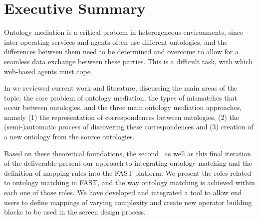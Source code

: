 \documentclass{fast_latex}
\begin{document}
\newpage


\clearpage

\section*{Executive Summary}
\doublespacing
Ontology mediation is a critical problem in heterogeneous environments, since inter-operating services and agents often use different
ontologies, and the differences between them need to be determined and overcome to allow for a seamless data exchange between these parties.
This is a difficult task, with which web-based agents must cope. 

In \cite{ambrus2009mediation} we reviewed current work and literature, discussing the main areas of the topic: the core problem of ontology mediation, the types of mismatches that occur between ontologies, and the three main ontology mediation approaches, namely (1) the representation of correspondences between ontologies, (2) the (semi-)automatic process of discovering these correspondences and (3) creation of a new ontology from the source ontologies. 

Based on these theoretical foundations, the second~\cite{ambrus2010mediation} as well as this final iteration of the deliverable present our approach to integrating ontology matching and the definition of mapping rules into the FAST platform. We present the roles related to ontology matching in FAST, and the way ontology matching is achieved within each one of those roles. We have developed and integrated a tool to allow end users to define mappings of varying complexity and create new operator building blocks to be used in the screen design process.

\newpage


\clearpage
\end{document}
